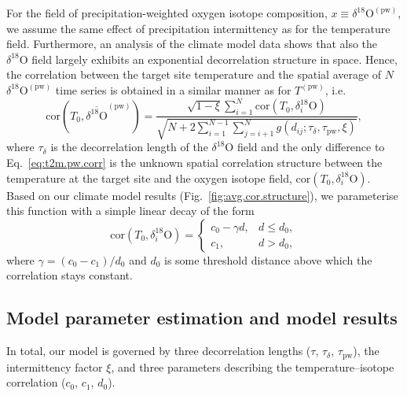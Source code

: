 \documentclass[cp, manuscript]{copernicus}
\begin{document}
For the field of precipitation-weighted oxygen isotope composition, $x \equiv
\delta^{18}\mathrm{O}^{\mathrm{(pw)}}$, we assume the same effect of
precipitation intermittency as for the temperature field. Furthermore, an
analysis of the climate model data shows that also the $\delta^{18}\mathrm{O}$
field largely exhibits an exponential decorrelation structure in space. Hence,
the correlation between the target site temperature and the spatial average of
$N$ $\delta^{18}\mathrm{O}^{\mathrm{(pw)}}$ time series is obtained in a similar
manner as for $T^{\mathrm{(pw)}}$, i.e.
%
\begin{equation}
\label{eq:oxy.pw.corr}
\mathrm{cor}\left(T_0,
  \overline{\delta^{18}\mathrm{O}}^{\mathrm{(pw)}}\right)=
\frac
{\sqrt{1-\xi}\sum_{i=1}^{N}\mathrm{cor}\left(T_0,\delta_i^{18}\mathrm{O}\right)}
{\sqrt{N + 2\sum_{i=1}^{N-1}\sum_{j=i+1}^{N}
  g(d_{ij}; \tau_{\delta}, \tau_{\mathrm{pw}}, \xi)}},
\end{equation}
%
where $\tau_{\delta}$ is the decorrelation length of the $\delta^{18}\mathrm{O}$
field and the only difference to Eq.~\eqref{eq:t2m.pw.corr} is the unknown
spatial correlation structure between the temperature at the target site and the
oxygen isotope field, $\mathrm{cor}\left(T_0,\delta_i^{18}\mathrm{O}\right)$.
Based on our climate model results (Fig.~\ref{fig:avg.cor.structure}), we
parameterise this function with a simple linear decay of the form
%
\begin{equation}
\label{eq:t2m.oxy.corr}
\mathrm{cor}\left(T_0,\delta_i^{18}\mathrm{O}\right)=
\begin{cases}
  c_0 - \gamma d, & d \le d_0,\\
  c_1, & d > d_0,
\end{cases}
\end{equation}
%
where $\gamma=(c_0-c_1)/d_0$ and $d_0$ is some threshold distance above which
the correlation stays constant.

\subsection{Model parameter estimation and model results}
\label{app:concept.model.estimation}

In total, our model is governed by three decorrelation lengths ($\tau$,
$\tau_{\delta}$, $\tau_{\mathrm{pw}}$), the intermittency factor $\xi$, and
three parameters describing the temperature--isotope correlation ($c_0$, $c_1$,
$d_0$).
\end{document}
